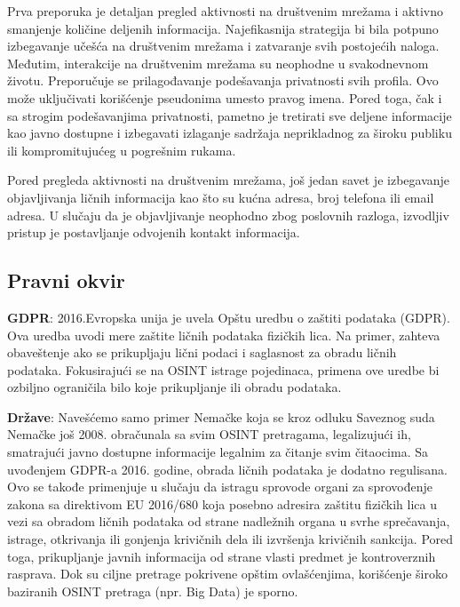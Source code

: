 \documentclass[a4paper, 11pt]{article}
\begin{document}
Prva preporuka je detaljan pregled aktivnosti na društvenim mrežama i aktivno smanjenje količine deljenih informacija. Najefikasnija strategija bi bila potpuno izbegavanje učešća na društvenim mrežama i zatvaranje svih postojećih naloga. Međutim, interakcije na društvenim mrežama su neophodne u svakodnevnom životu. Preporučuje se prilagođavanje podešavanja privatnosti svih profila. Ovo može uključivati korišćenje pseudonima umesto pravog imena. Pored toga, čak i sa strogim podešavanjima privatnosti, pametno je tretirati sve deljene informacije kao javno dostupne i izbegavati izlaganje sadržaja neprikladnog za široku publiku ili kompromitujućeg u pogrešnim rukama.\newline

Pored pregleda aktivnosti na društvenim mrežama, još jedan savet je izbegavanje objavljivanja ličnih informacija kao što su kućna adresa, broj telefona ili email adresa. U slučaju da je objavljivanje neophodno zbog poslovnih razloga, izvodljiv pristup je postavljanje odvojenih kontakt informacija.
\subsection{Pravni okvir}
\textbf{GDPR}: 2016.Evropska unija je uvela Opštu uredbu o zaštiti podataka (GDPR). Ova uredba uvodi mere zaštite ličnih podataka fizičkih lica. Na primer, zahteva obaveštenje ako se prikupljaju lični podaci i saglasnost za obradu ličnih podataka. Fokusirajući se na OSINT istrage pojedinaca, primena ove uredbe bi ozbiljno ograničila bilo koje prikupljanje ili obradu podataka.\newline

\textbf{Države}: Navešćemo samo primer Nemačke koja se kroz odluku Saveznog suda Nemačke još 2008. obračunala sa svim OSINT pretragama, legalizujući ih, smatrajući javno dostupne informacije legalnim za čitanje svim čitaocima.
Sa uvođenjem GDPR-a 2016. godine, obrada ličnih podataka je dodatno regulisana. Ovo se takođe primenjuje u slučaju da istragu sprovode organi za sprovođenje zakona sa direktivom EU 2016/680 koja posebno adresira zaštitu fizičkih lica u vezi sa obradom ličnih podataka od strane nadležnih organa u svrhe sprečavanja, istrage, otkrivanja ili gonjenja krivičnih dela ili izvršenja krivičnih sankcija.
Pored toga, prikupljanje javnih informacija od strane vlasti predmet je kontroverznih rasprava. Dok su ciljne pretrage pokrivene opštim ovlašćenjima, korišćenje široko baziranih OSINT pretraga (npr. Big Data) je sporno.\newline
\end{document}
